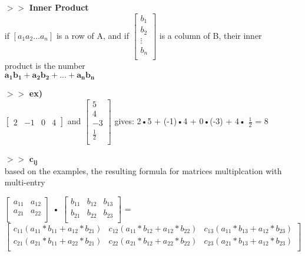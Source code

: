 \documentclass{article}
\begin{document}
\begin{itemize}
    \item[$>>$] \textbf{Inner Product} \\
    if $[a_1 a_2 \hdots a_n]$ is a row of A, and if 
    $\begin{bmatrix} 
        b_1 \\ 
        b_2 \\ 
        \vdots \\
        b_n \\
    \end{bmatrix}$
    is a column of B, their inner product is the number \\ $\mathbf{a_1b_1 + a_2b_2 + \hdots + a_nb_n}$

    \item[$>>$] \textbf{ex)} \\ 
    $\begin{bmatrix} 
        2 & -1 & 0 & 4
    \end{bmatrix}$
    and 
    $\begin{bmatrix} 
        5 \\ 
        4 \\ 
        -3 \\
        \frac{1}{2} \\
    \end{bmatrix}$
    gives: 2•5 + (-1)•4 + 0•(-3) + 4• $\frac{1}{2}$ = 8

    \item[$>>$] $\mathbf{c_{ij}}$ \\ 
    based on the examples, the resulting formula for matrices multiplcation with multi-entry

    $\begin{bmatrix} 
        a_{11} & a_{12} \\ 
        a_{21} & a_{22} \\ 
    \end{bmatrix}$
    • 
    $\begin{bmatrix} 
        b_{11} & b_{12} & b_{13} \\ 
        b_{21} & b_{22} & b_{23} \\ 
    \end{bmatrix}$
    = \\
    $\begin{bmatrix} 
        c_{11}(a_{11}*b_{11} + a_{12}*b_{21}) & c_{12}(a_{11}*b_{12} + a_{12}*b_{22}) & c_{13}(a_{11}*b_{13} + a_{12}*b_{23}) \\ 
        c_{21}(a_{21}*b_{11} + a_{22}*b_{21}) & c_{22}(a_{21}*b_{12} + a_{22}*b_{22}) & c_{23}(a_{21}*b_{13} + a_{12}*b_{23}) \\ 
    \end{bmatrix}$

\end{itemize}
\end{document}
